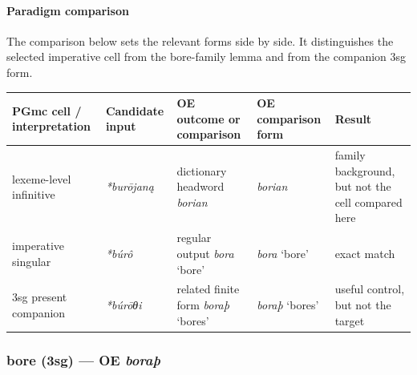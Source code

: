 \documentclass[
  british,
  a4paper,
]{article}
\newcounter{none} %
\begin{document}
\paragraph{Paradigm comparison}\label{paradigm-comparison-19}

The comparison below sets the relevant forms side by side. It
distinguishes the selected imperative cell from the bore-family lemma
and from the companion 3sg form.

{\def\LTcaptype{none} %
\begin{longtable}[]{@{}
  >{\raggedright\arraybackslash}p{}
  >{\raggedright\arraybackslash}p{}
  >{\raggedright\arraybackslash}p{}
  >{\raggedright\arraybackslash}p{}
  >{\raggedright\arraybackslash}p{}@{}}
\toprule\noalign{}
\begin{minipage}[b]{\linewidth}\raggedright
PGmc cell / interpretation
\end{minipage} & \begin{minipage}[b]{\linewidth}\raggedright
Candidate input
\end{minipage} & \begin{minipage}[b]{\linewidth}\raggedright
OE outcome or comparison
\end{minipage} & \begin{minipage}[b]{\linewidth}\raggedright
OE comparison form
\end{minipage} & \begin{minipage}[b]{\linewidth}\raggedright
Result
\end{minipage} \\
\midrule\noalign{}
\endhead
\bottomrule\noalign{}
\endlastfoot
lexeme-level infinitive & {\emph{*burōjaną}} & dictionary headword
{\emph{borian}} & {\emph{borian}} & family background, but not the cell
compared here \\
imperative singular & {\emph{*búrô}} & regular output {\emph{bora}}
`bore' & {\emph{bora}} `bore' & exact match \\
3sg present companion & {\emph{*búrōθi}} & related finite form
{\emph{boraþ}} `bores' & {\emph{boraþ}} `bores' & useful control, but
not the target \\
\end{longtable}
}

\subsubsection{\texorpdfstring{bore (3sg) --- OE
\emph{boraþ}}{bore (3sg) --- OE boraþ}}\label{bore-3sg-oe-borauxfe}
\end{document}
